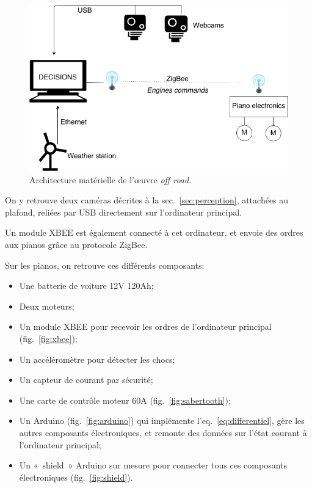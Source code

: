 \documentclass[french,A4paper,]{book}
\providecommand{\tightlist}{%
  \setlength{\itemsep}{0pt}\setlength{\parskip}{0pt}}
\begin{document}
\begin{figure}
\centering
\includegraphics[width=1.00000\textwidth]{imgs/overview.png}
\caption{Architecture matérielle de l'œuvre \emph{off
road}.}\label{fig:overview}
\end{figure}

On y retrouve deux caméras décrites à la sec.~\ref{sec:perception},
attachées au plafond, reliées par USB directement sur l'ordinateur
principal.

Un module XBEE est également connecté à cet ordinateur, et envoie des
ordres aux pianos grâce au protocole ZigBee.

Sur les pianos, on retrouve ces différents composants:

\begin{itemize}
\tightlist
\item
  Une batterie de voiture 12V 120Ah;
\item
  Deux moteurs;
\item
  Un module XBEE pour recevoir les ordres de l'ordinateur principal
  (fig.~\ref{fig:xbee});
\item
  Un accéléromètre pour détecter les chocs;
\item
  Un capteur de courant par sécurité;
\item
  Une carte de contrôle moteur 60A (fig.~\ref{fig:sabertooth});
\item
  Un Arduino (fig.~\ref{fig:arduino}) qui implémente
  l'eq.~\ref{eq:differentiel}, gère les autres composants électroniques,
  et remonte des données sur l'état courant à l'ordinateur principal;
\item
  Un «~shield~» Arduino sur mesure pour connecter tous ces composants
  électroniques (fig.~\ref{fig:shield}).
\end{itemize}
\end{document}
